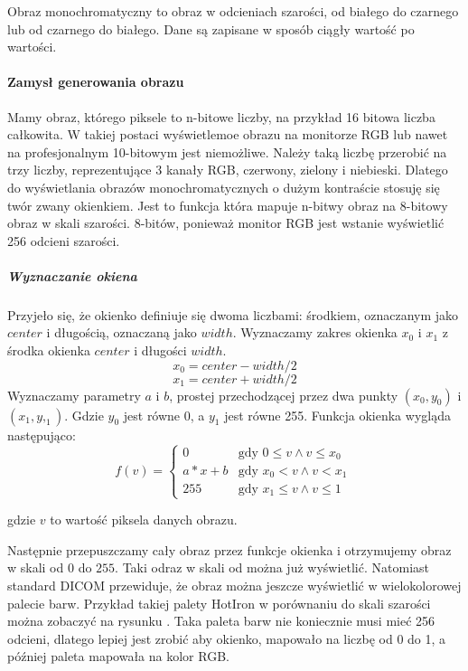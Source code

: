 
Obraz monochromatyczny to obraz w odcieniach szarości, od białego do czarnego lub od czarnego do białego. Dane są zapisane w sposób ciągły wartość po wartości.

\paragraph{Zamysł generowania obrazu}

Mamy obraz, którego piksele to n-bitowe liczby, na przykład 16 bitowa liczba całkowita.
W takiej postaci wyświetlemoe obrazu na monitorze RGB lub nawet na profesjonalnym 10-bitowym jest niemożliwe.
Należy taką liczbę przerobić na trzy liczby, reprezentujące 3 kanały RGB, czerwony, zielony i niebieski.
Dlatego do wyświetlania obrazów monochromatycznych o dużym kontraście stosuję się twór zwany okienkiem.
Jest to funkcja która mapuje n-bitwy obraz na 8-bitowy obraz w skali szarości.
8-bitów, ponieważ monitor RGB jest wstanie wyświetlić 256 odcieni szarości.

\subparagraph{Wyznaczanie okiena}
Przyjeło się, że okienko definiuje się dwoma liczbami: środkiem, oznaczanym jako $center$ i długością, oznaczaną jako $width$.
Wyznaczamy zakres okienka $x_0$ i $x_1$ z środka okienka $center$ i długości $width$.
\[x_0 = center - width / 2\]
\[x_1 = center + width / 2\]
Wyznaczamy parametry $a$ i $b$, prostej przechodzącej przez dwa punkty $(x_0, y_0)$ i $(x_1, y,_1)$.
Gdzie $y_0$ jest równe 0, a $y_1$ jest równe 255.
Funkcja okienka wygląda następująco:
\[
    f(v)=
    \begin{cases}
        0     & \text{gdy $0 \le v \wedge v \le x_0$ } \\
        a*x+b & \text{gdy $x_0 < v \wedge v < x_1$}    \\
        255   & \text{gdy $x_1 \le v \wedge v \le 1$ }
    \end{cases}
\]

gdzie $v$ to wartość piksela danych obrazu.

Następnie przepuszczamy cały obraz przez funkcje okienka i otrzymujemy obraz w skali od $0$ do $255$.
Taki odraz w skali od można już wyświetlić.
Natomiast standard DICOM przewiduje, że obraz można jeszcze wyświetlić w wielokolorowej palecie barw.
Przykład takiej palety HotIron w porównaniu do skali szarości można zobaczyć na rysunku .
Taka paleta barw nie koniecznie musi mieć 256 odcieni, dlatego lepiej jest zrobić aby okienko, mapowało na liczbę od 0 do 1, a później paleta mapowała na kolor RGB.

